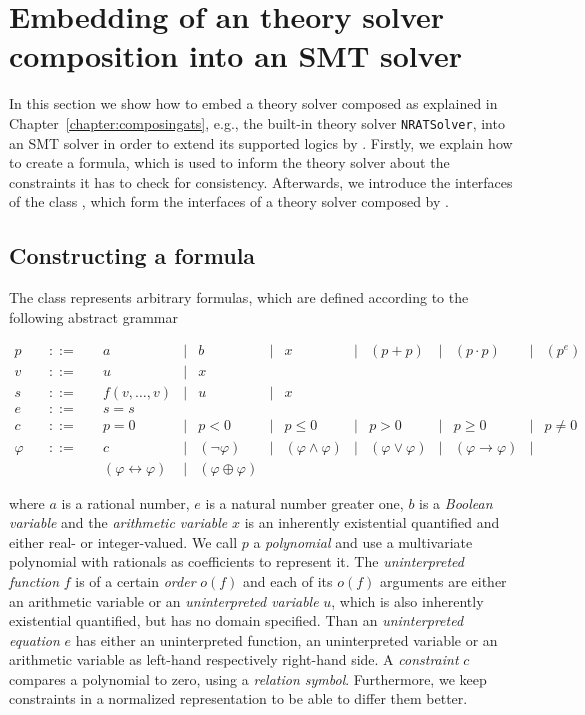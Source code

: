 \chapter{Embedding of an \smtrat theory solver composition into an SMT solver}
\label{chapter:embeddingats}
In this section we show how to embed a theory solver composed as explained
in Chapter~\ref{chapter:composingats}, e.g., the built-in theory 
solver \texttt{NRATSolver}, into an SMT solver in order to 
extend its supported logics by \SmtratLogic. Firstly, we explain how to
create a \SmtratLogic formula, which is used to inform the theory solver about the
constraints it has to check for consistency. Afterwards, we introduce the 
interfaces of the class \managerClass, which form the interfaces of
a theory solver composed by \smtrat.

\section{Constructing a \SmtratLogic formula}
The class \formulaClass represents arbitrary \SmtratLogic formulas, which are
defined according to the following abstract grammar

\[
\begin{array}{rccccccccccccc}
  p &\quad ::=\quad & a & | & b & | & x & | & (p + p) & | & (p \cdot p) & | & (p^e) \\
  v &\quad ::=\quad & u & | & x \\
  s &\quad ::=\quad & f(v,\ldots,v) & | & u & | & x \\
  e &\quad ::=\quad & s = s \\
  c &\quad ::=\quad & p = 0 & | & p < 0 & | & p \leq 0 & | & p > 0 & | & p \geq 0 & | & p \neq 0 \\
 \varphi &\quad ::=\quad & c & | & (\neg \varphi) & | &
 (\varphi\land\varphi) & | &
 (\varphi\lor\varphi) & | & 
 (\varphi\rightarrow\varphi) & | \\ &&
 (\varphi\leftrightarrow\varphi) & | &
 (\varphi\oplus\varphi)
\end{array}
\]

where $a$ is a rational number, $e$ is a natural number greater one, $b$ is a \emph{Boolean variable} and the \emph{arithmetic variable} $x$ is an inherently existential quantified and either real- or integer-valued. We call $p$ a \emph{polynomial} and use a \carl multivariate polynomial with \cln rationals as coefficients to represent it. The \emph{uninterpreted function} $f$ is of a certain \emph{order} $o(f)$ and each of its $o(f)$ arguments are either an arithmetic variable or an \emph{uninterpreted variable} $u$, which is also inherently existential quantified, but has no domain specified. Than an \emph{uninterpreted equation} $e$ has either an uninterpreted function, an uninterpreted variable or an arithmetic variable as left-hand respectively right-hand side. A \emph{constraint} $c$ compares a polynomial to zero, using a \emph{relation symbol}. Furthermore, we keep constraints in a normalized representation to be able to differ them better.

